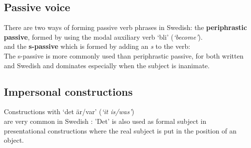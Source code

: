 \documentclass{report}
\begin{document}
\subsection{Passive voice}
There are two ways of forming passive verb phrases in Swedish: the 
\textbf{periphrastic passive}, formed by using the modal auxiliary verb `bli' (\emph{`become'}).\\
\label{gfPass:peri-pass}
and the \textbf{s-passive} which is formed by adding an \emph{s} to the verb: \\
\label{gfPass:s-pass}
The s-passive is more commonly used than periphrastic passive, for both written
and Swedish \cite[Pass. ]{SAG} and dominates especially when the subject is inanimate.

\subsection{Impersonal constructions}
Constructions with `det är/var' (\emph{`it is/was'}) \\are very common in Swedish
\cite[\textsection 309d]{H&H}:
'Det' %
is also used as formal subject in presentational constructions where
the real subject is put in the position of an object.
\end{document}
